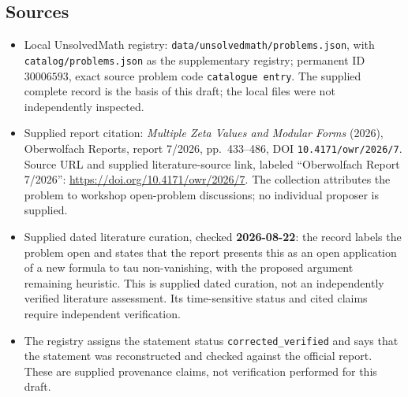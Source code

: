 \documentclass[11pt]{article}
\begin{document}
\subsection{Sources}
\begin{itemize}
\item Local UnsolvedMath registry: \texttt{data/unsolvedmath/problems.json}, with \texttt{catalog/problems.json} as the supplementary registry; permanent ID \(30006593\), exact source problem code \texttt{catalogue entry}. The supplied complete record is the basis of this draft; the local files were not independently inspected.
\item Supplied report citation: \emph{Multiple Zeta Values and Modular Forms} (2026), Oberwolfach Reports, report 7/2026, pp.~433--486, DOI \texttt{10.4171/owr/2026/7}. Source URL and supplied literature-source link, labeled ``Oberwolfach Report 7/2026'': \url{https://doi.org/10.4171/owr/2026/7}. The collection attributes the problem to workshop open-problem discussions; no individual proposer is supplied.
\item Supplied dated literature curation, checked \textbf{2026-08-22}: the record labels the problem open and states that the report presents this as an open application of a new formula to tau non-vanishing, with the proposed argument remaining heuristic. This is supplied dated curation, not an independently verified literature assessment. Its time-sensitive status and cited claims require independent verification.
\item The registry assigns the statement status \texttt{corrected\_verified} and says that the statement was reconstructed and checked against the official report. These are supplied provenance claims, not verification performed for this draft.
\end{itemize}
\end{document}
